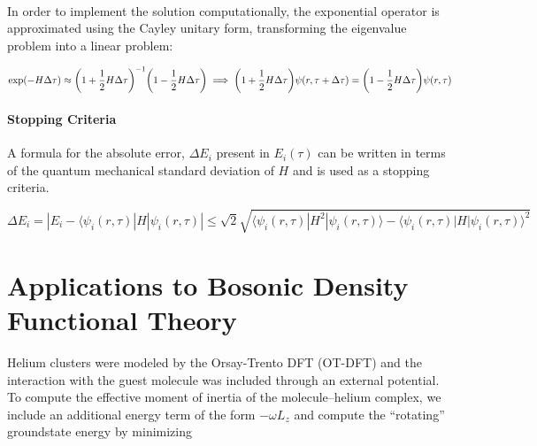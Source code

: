 \documentclass[a0b,landscape]{a0poster}
\newcommand{\pl}{\partial}
\DeclarePairedDelimiter{\biggP}{\bigg(}{\bigg)}
\newcommand{\pdif}[2]{\frac{\pl #1}{\pl #2}}
\begin{document}
\begin{multicols}{3}

\paragraph{} In order to implement the solution computationally, the exponential
operator is approximated using the Cayley unitary form, transforming the eigenvalue problem into a linear problem:

\begin{equation}
\label{eq:CayleyExpansion}
\exp(-H\Delta\tau)\approx\biggP{1+\frac{1}{2}H\Delta\tau}^{-1}\biggP{1-\frac{1}{2}H\Delta\tau} \implies \biggP{1+\frac{1}{2}H\Delta\tau}\psi(r,\tau+\Delta\tau)=\biggP{1-\frac{1}{2}H\Delta\tau}\psi(r,\tau)
\end{equation}

\paragraph{Stopping Criteria}
A formula for the absolute error, \(\Delta E_i\) present in \(E_i(\tau)\) can be written in terms of the quantum mechanical standard deviation of \(H\) and is used as a stopping criteria.

\begin{equation}
\label{eq:error}
\Delta E_i = |E_i -\langle\psi_i(r,\tau)|H|\psi_i(r,\tau)|\leq\sqrt{2}\sqrt{\langle\psi_i(r,\tau)|H^2|\psi_i(r,\tau)\rangle-\langle\psi_i(r,\tau)|H|\psi_i(r,\tau)\rangle^2}
\end{equation}


\color{Black} %

\section*{Applications to Bosonic Density Functional Theory}

Helium clusters were modeled by the Orsay-Trento DFT (OT-DFT) and the
interaction with the guest molecule was included through an external
potential. To compute the effective moment of inertia of the
molecule--helium complex, we include an additional energy term of the
form \(-\omega L_z\) and compute the ``rotating'' groundstate energy by
minimizing


\end{multicols}
\end{document}
